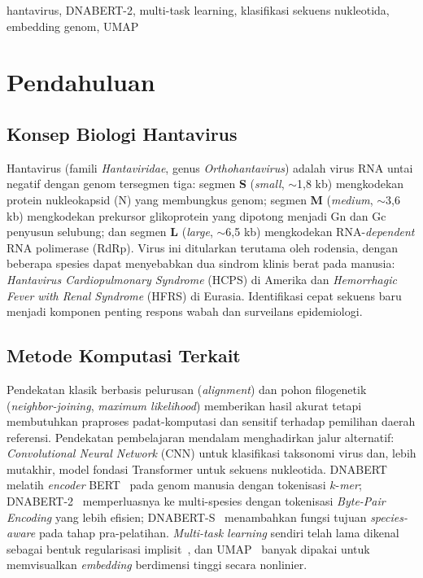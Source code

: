 \documentclass[conference]{IEEEtran}
\begin{document}
\begin{IEEEkeywords}
hantavirus, DNABERT-2, multi-task learning, klasifikasi sekuens nukleotida,
embedding genom, UMAP
\end{IEEEkeywords}

\section{Pendahuluan}\label{sec:intro}

\subsection{Konsep Biologi Hantavirus}

Hantavirus (famili \emph{Hantaviridae}, genus \emph{Orthohantavirus})
adalah virus RNA untai negatif dengan genom tersegmen tiga: segmen
\textbf{S} (\emph{small}, $\sim$1{,}8 kb) mengkodekan protein nukleokapsid
(N) yang membungkus genom; segmen \textbf{M} (\emph{medium}, $\sim$3{,}6 kb)
mengkodekan prekursor glikoprotein yang dipotong menjadi Gn dan Gc
penyusun selubung; dan segmen \textbf{L} (\emph{large}, $\sim$6{,}5 kb)
mengkodekan RNA-\emph{dependent} RNA polimerase (RdRp). Virus ini
ditularkan terutama oleh rodensia, dengan beberapa spesies dapat
menyebabkan dua sindrom klinis berat pada manusia:
\emph{Hantavirus Cardiopulmonary Syndrome} (HCPS) di Amerika dan
\emph{Hemorrhagic Fever with Renal Syndrome} (HFRS) di Eurasia.
Identifikasi cepat sekuens baru menjadi komponen penting respons wabah
dan surveilans epidemiologi.

\subsection{Metode Komputasi Terkait}

Pendekatan klasik berbasis pelurusan (\emph{alignment}) dan pohon
filogenetik (\emph{neighbor-joining}, \emph{maximum likelihood})
memberikan hasil akurat tetapi membutuhkan praproses padat-komputasi dan
sensitif terhadap pemilihan daerah referensi. Pendekatan pembelajaran
mendalam menghadirkan jalur alternatif: \emph{Convolutional Neural Network}
(CNN) untuk klasifikasi taksonomi virus dan, lebih mutakhir, model fondasi
Transformer untuk sekuens nukleotida. \textsc{DNABERT}~\cite{Ji2021DNABERT}
melatih \emph{encoder} BERT~\cite{Devlin2019BERT} pada genom manusia
dengan tokenisasi $k$-\emph{mer}; \textsc{DNABERT-2}~\cite{Zhou2023DNABERT2}
memperluasnya ke multi-spesies dengan tokenisasi \emph{Byte-Pair Encoding}
yang lebih efisien; \textsc{DNABERT-S}~\cite{Zhou2024DNABERTS} menambahkan
fungsi tujuan \emph{species-aware} pada tahap pra-pelatihan.
\emph{Multi-task learning} sendiri telah lama dikenal sebagai bentuk
regularisasi implisit~\cite{Caruana1997MTL}, dan \textsc{UMAP}~\cite{McInnes2018UMAP}
banyak dipakai untuk memvisualkan \emph{embedding} berdimensi tinggi
secara nonlinier.
\end{document}
